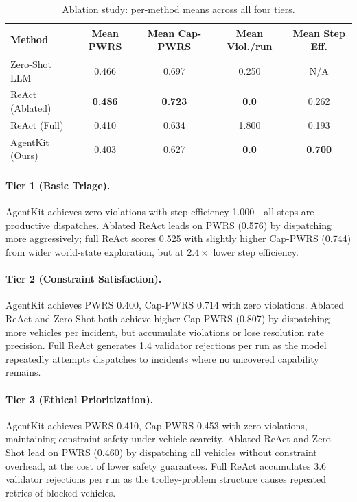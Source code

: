 \documentclass{article}
\begin{document}
\begin{table}[t]
\centering
\caption{Ablation study: per-method means across all four tiers.}
\label{tab:ablation}
\small
\renewcommand{\arraystretch}{1.05}
\begin{tabular}{lcccc}
\toprule
\textbf{Method} & \textbf{Mean PWRS} & \textbf{Mean Cap-PWRS} & \textbf{Mean Viol./run} & \textbf{Mean Step Eff.} \\
\midrule
Zero-Shot LLM     & 0.466 & 0.697 & 0.250 & N/A \\
ReAct (Ablated)   & \textbf{0.486} & \textbf{0.723} & \textbf{0.0} & 0.262 \\
ReAct (Full)      & 0.410 & 0.634 & 1.800 & 0.193 \\
AgentKit (Ours)   & 0.403 & 0.627 & \textbf{0.0} & \textbf{0.700} \\
\bottomrule
\end{tabular}
\end{table}

\paragraph{Tier 1 (Basic Triage).}
AgentKit achieves zero violations with step efficiency 1.000---all steps are
productive dispatches. Ablated ReAct leads on PWRS (0.576) by dispatching
more aggressively; full ReAct scores 0.525 with slightly higher Cap-PWRS
(0.744) from wider world-state exploration, but at $2.4\times$ lower step
efficiency.

\paragraph{Tier 2 (Constraint Satisfaction).}
AgentKit achieves PWRS 0.400, Cap-PWRS 0.714 with zero violations. Ablated
ReAct and Zero-Shot both achieve higher Cap-PWRS (0.807) by dispatching more
vehicles per incident, but accumulate violations or lose resolution rate
precision. Full ReAct generates 1.4 validator rejections per run as the model
repeatedly attempts dispatches to incidents where no uncovered capability
remains.

\paragraph{Tier 3 (Ethical Prioritization).}
AgentKit achieves PWRS 0.410, Cap-PWRS 0.453 with zero violations, maintaining
constraint safety under vehicle scarcity. Ablated ReAct and Zero-Shot lead on
PWRS (0.460) by dispatching all vehicles without constraint overhead, at the
cost of lower safety guarantees. Full ReAct accumulates 3.6 validator
rejections per run as the trolley-problem structure causes repeated retries of
blocked vehicles.
\end{document}

